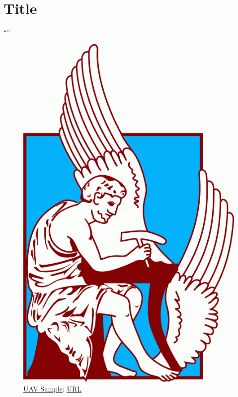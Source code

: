 \chapter{Title} %
\label{chap:ChapterX}  %
\epigraph{``” }{\textit{}}

% 
% 
\begin{figure} [H]
	\centering
	\includegraphics[scale=0.3]{Images/TUC_logo.png}
	\decoRule
	\caption[UAV]{\hyperref[abbr:UAV Sample]{UAV Sample}: \href{google.com}{URL}}
	\label{fig:UAV-sample}
\end{figure}

